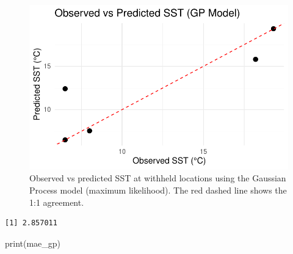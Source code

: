 \documentclass[
  11pt,
]{article}
\newenvironment{Shaded}{\begin{snugshade}}{\end{snugshade}}
\newcommand{\CommentTok}[1]{\textcolor[rgb]{0.37,0.37,0.37}{#1}}
\newcommand{\DecValTok}[1]{\textcolor[rgb]{0.68,0.00,0.00}{#1}}
\newcommand{\FunctionTok}[1]{\textcolor[rgb]{0.28,0.35,0.67}{#1}}
\newcommand{\NormalTok}[1]{\textcolor[rgb]{0.00,0.23,0.31}{#1}}
\newcommand{\OtherTok}[1]{\textcolor[rgb]{0.00,0.23,0.31}{#1}}
\newcommand{\SpecialCharTok}[1]{\textcolor[rgb]{0.37,0.37,0.37}{#1}}
\begin{document}
\begin{figure}[H]

{\centering \includegraphics{project_files/figure-pdf/fig-gp_pred_scatter-1.pdf}

}

\caption{Observed vs predicted SST at withheld locations using the
Gaussian Process model (maximum likelihood). The red dashed line shows
the 1:1 agreement.}

\end{figure}%

\begin{Shaded}
\end{Shaded}

\begin{verbatim}
[1] 2.857011
\end{verbatim}

\begin{Shaded}
\begin{Highlighting}[]
\FunctionTok{print}\NormalTok{(mae\_gp)}
\end{Highlighting}
\end{Shaded}
\end{document}
